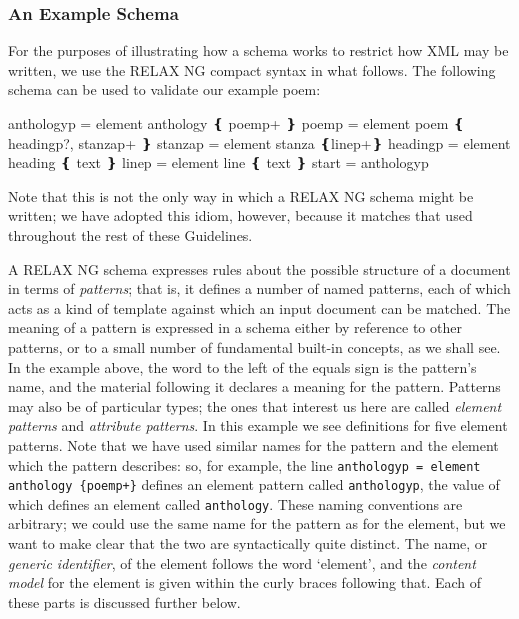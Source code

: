 \subsubsection[{An Example Schema}]{An Example Schema}\label{SG141bis}\par
For the purposes of illustrating how a schema works to restrict how XML may be written, we use the RELAX NG compact syntax in what follows. The following schema can be used to validate our example poem: \par\hfill\bgroup\exampleFont\vskip 10pt\begin{shaded}
\obeyspaces anthology\textunderscore p = element anthology ❴ poem\textunderscore p+ ❵\newline
poem\textunderscore p = element poem ❴ heading\textunderscore p?, stanza\textunderscore p+ ❵\newline
stanza\textunderscore p = element stanza ❴line\textunderscore p+❵\newline
heading\textunderscore p = element heading ❴ text ❵\newline
line\textunderscore p = element line ❴ text ❵\newline
start = anthology\textunderscore p\end{shaded}
\par\egroup 
\par
Note that this is not the only way in which a RELAX NG schema might be written; we have adopted this idiom, however, because it matches that used throughout the rest of these Guidelines.\par
A RELAX NG schema expresses rules about the possible structure of a document in terms of \textit{patterns}; that is, it defines a number of named patterns, each of which acts as a kind of template against which an input document can be matched. The meaning of a pattern is expressed in a schema either by reference to other patterns, or to a small number of fundamental built-in concepts, as we shall see. In the example above, the word to the left of the equals sign is the pattern's name, and the material following it declares a meaning for the pattern. Patterns may also be of particular types; the ones that interest us here are called \textit{element patterns} and \textit{attribute patterns}. In this example we see definitions for five element patterns. Note that we have used similar names for the pattern and the element which the pattern describes: so, for example, the line \texttt{anthology\textunderscore p = element anthology \{poem\textunderscore p+\}} defines an element pattern called \texttt{anthology\textunderscore p}, the value of which defines an element called \texttt{anthology}. These naming conventions are arbitrary; we could use the same name for the pattern as for the element, but we want to make clear that the two are syntactically quite distinct. The name, or \textit{generic identifier}, of the element follows the word ‘element’, and the \textit{content model} for the element is given within the curly braces following that. Each of these parts is discussed further below.\par
